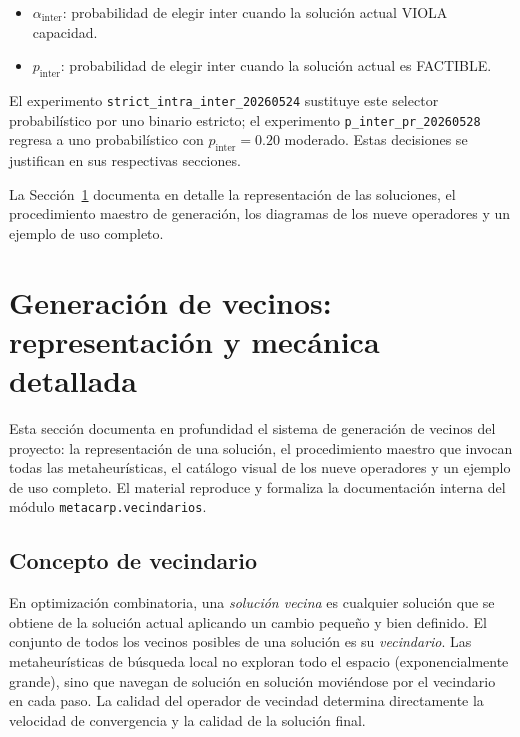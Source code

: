 \begin{itemize}
\item $\alpha_{\text{inter}}$: probabilidad de elegir inter cuando la
  solución actual VIOLA capacidad.
\item $p_{\text{inter}}$: probabilidad de elegir inter cuando la
  solución actual es FACTIBLE.
\end{itemize}

El experimento \texttt{strict\_intra\_inter\_20260524} sustituye este
selector probabilístico por uno binario estricto; el experimento
\texttt{p\_inter\_pr\_20260528} regresa a uno probabilístico con
$p_{\text{inter}} = 0.20$ moderado. Estas decisiones se justifican en
sus respectivas secciones.

La Sección~\ref{sec:generacion-vecinos} documenta en detalle la representación de las soluciones, el procedimiento maestro de generación, los diagramas de los nueve operadores y un ejemplo de uso completo.

\section{Generación de vecinos: representación y mecánica detallada}
\label{sec:generacion-vecinos}

Esta sección documenta en profundidad el sistema de generación de vecinos
del proyecto: la representación de una solución, el procedimiento maestro
que invocan todas las metaheurísticas, el catálogo visual de los nueve
operadores y un ejemplo de uso completo. El material reproduce y formaliza
la documentación interna del módulo \texttt{metacarp.vecindarios}.

\subsection{Concepto de vecindario}

En optimización combinatoria, una \emph{solución vecina} es cualquier
solución que se obtiene de la solución actual aplicando un cambio pequeño
y bien definido. El conjunto de todos los vecinos posibles de una solución
es su \emph{vecindario}. Las metaheurísticas de búsqueda local no exploran
todo el espacio (exponencialmente grande), sino que navegan de solución en
solución moviéndose por el vecindario en cada paso. La calidad del operador
de vecindad determina directamente la velocidad de convergencia y la
calidad de la solución final.

